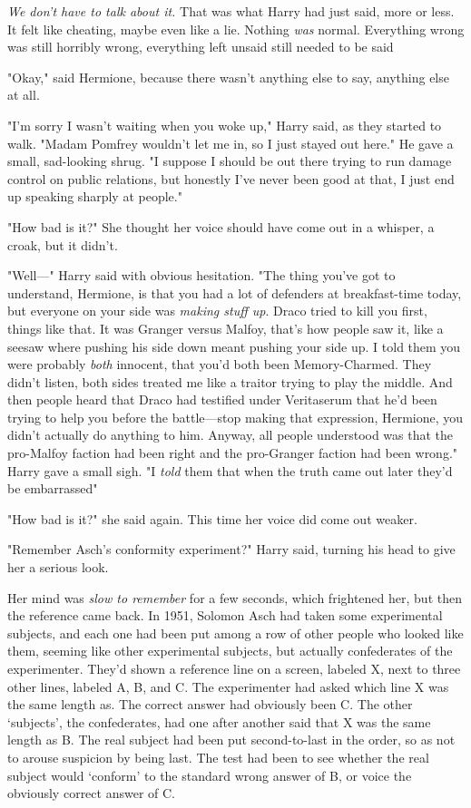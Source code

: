 \emph{We don't have to talk about it.} That was what Harry had just said, more
or less. It felt like cheating, maybe even like a lie. Nothing \emph{was}
normal. Everything wrong was still horribly wrong, everything left unsaid still
needed to be said{\el}

"Okay," said Hermione, because there wasn't anything else to say, anything else
at all.

"I'm sorry I wasn't waiting when you woke up," Harry said, as they started to
walk. "Madam Pomfrey wouldn't let me in, so I just stayed out here." He gave a
small, sad-looking shrug. "I suppose I should be out there trying to run damage
control on public relations, but{\el} honestly I've never been good at that,
I just end up speaking sharply at people."

"How bad is it?" She thought her voice should have come out in a whisper, a
croak, but it didn't.

"Well\mbox{---}" Harry said with obvious hesitation. "The thing you've got to
understand, Hermione, is that you had a lot of defenders at breakfast-time
today, but everyone on your side was{\el} \emph{making stuff up}. Draco
tried to kill you first, things like that. It was Granger versus Malfoy, that's
how people saw it, like a seesaw where pushing his side down meant pushing your
side up. I told them you were probably \emph{both} innocent, that you'd both
been Memory-Charmed. They didn't listen, both sides treated me like a traitor
trying to play the middle. And then people heard that Draco had testified under
Veritaserum that he'd been trying to help you before the battle---stop making
that expression, Hermione, you didn't actually do anything to him. Anyway, all
people understood was that the pro-Malfoy faction had been right and the
pro-Granger faction had been wrong." Harry gave a small sigh. "I \emph{told}
them that when the truth came out later they'd be embarrassed{\el}"

"How bad is it?" she said again. This time her voice did come out weaker.

"Remember Asch's conformity experiment?" Harry said, turning his head to give
her a serious look.

Her mind was \emph{slow to remember} for a few seconds, which frightened her,
but then the reference came back. In 1951, Solomon Asch had taken some
experimental subjects, and each one had been put among a row of other people
who looked like them, seeming like other experimental subjects, but actually
confederates of the experimenter. They'd shown a reference line on a screen,
labeled X, next to three other lines, labeled A, B, and C. The experimenter had
asked which line X was the same length as. The correct answer had obviously
been C. The other `subjects', the confederates, had one after another said that
X was the same length as B. The real subject had been put second-to-last in the
order, so as not to arouse suspicion by being last. The test had been to see
whether the real subject would `conform' to the standard wrong answer of B, or
voice the obviously correct answer of C.

